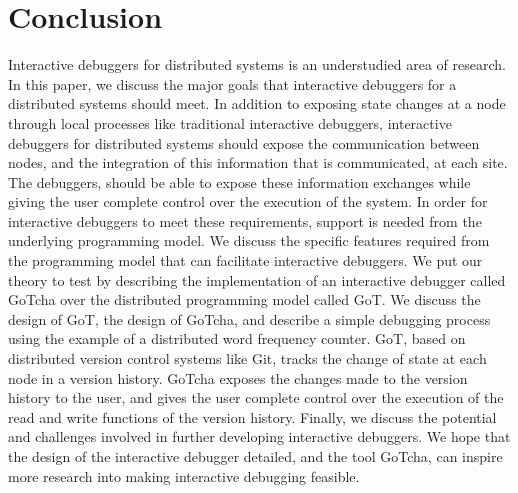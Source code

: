 \section{Conclusion}
\label{sec:conclusion}

Interactive debuggers for distributed systems is an understudied area of research. In this paper, we discuss the major goals that interactive debuggers for a distributed systems should meet. In addition to exposing state changes at a node through local processes like traditional interactive debuggers, interactive debuggers for distributed systems should expose the communication between nodes, and the integration of this information that is communicated, at each site. The debuggers, should be able to expose these information exchanges while giving the user complete control over the execution of the system. In order for interactive debuggers to meet these requirements, support is needed from the underlying programming model. We discuss the specific features required from the programming model that can facilitate interactive debuggers. We put our theory to test by describing the implementation of an interactive debugger called GoTcha over the distributed programming model called GoT. We discuss the design of GoT, the design of GoTcha, and describe a simple debugging process using the example of a distributed word frequency counter. GoT, based on distributed version control systems like Git, tracks the change of state at each node in a version history. GoTcha exposes the changes made to the version history to the user, and gives the user complete control over the execution of the read and write functions of the version history. Finally, we discuss the potential and challenges involved in further developing interactive debuggers. We hope that the design of the interactive debugger detailed, and the tool GoTcha, can inspire more research into making interactive debugging feasible.